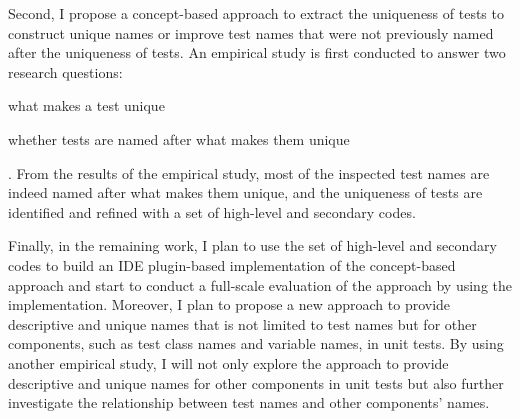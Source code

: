 Second, I propose a concept-based approach to extract the uniqueness of tests to construct unique names or improve test names that were not previously named after the uniqueness of tests.
%
An empirical study is first conducted to answer two research questions:
\begin{enumerate*}
\item what makes a test unique
\item whether tests are named after what makes them unique
\end{enumerate*}.
%
From the results of the empirical study, most of the inspected test names are indeed named after what makes them unique, and the uniqueness of tests are identified and refined with a set of high-level and secondary codes.


Finally, in the remaining work, I plan to use the set of high-level and secondary codes to build an IDE plugin-based implementation of the concept-based approach and start to conduct a full-scale evaluation of the approach by using the implementation.
%
Moreover, I plan to propose a new approach to provide descriptive and unique names that is not limited to test names but for other components, such as test class names and variable names, in unit tests.
%
By using another empirical study, I will not only explore the approach to provide descriptive and unique names for other components in unit tests but also further investigate the relationship between test names and other components' names.


